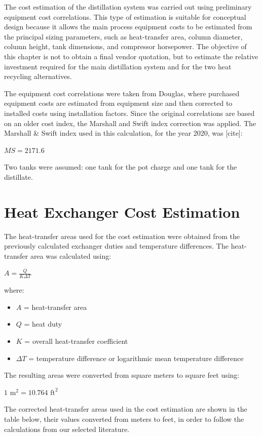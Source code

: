 The cost estimation of the distillation system was carried out using
preliminary equipment cost correlations. This type of estimation is
suitable for conceptual design because it allows the main process
equipment costs to be estimated from the principal sizing parameters,
such as heat-transfer area, column diameter, column height, tank
dimensions, and compressor horsepower. The objective of this chapter is
not to obtain a final vendor quotation, but to estimate the relative
investment required for the main distillation system and for the two
heat recycling alternatives.

The equipment cost correlations were taken from Douglas, where purchased
equipment costs are estimated from equipment size and then corrected to
installed costs using installation factors. Since the original
correlations are based on an older cost index, the Marshall and Swift
index correction was applied. The Marshall \& Swift index used in this
calculation, for the year 2020, was {[}cite{]}:

\(MS = 2171.6\)

Two tanks were assumed: one tank for the pot charge and one tank for the
distillate.

\section{Heat Exchanger Cost
Estimation}\label{heat-exchanger-cost-estimation}

The heat-transfer areas used for the cost estimation were obtained from
the previously calculated exchanger duties and temperature differences.
The heat-transfer area was calculated using:

\(A = \frac{Q}{K \Delta T}\)

where:

\begin{itemize}
\tightlist
\item
  \(A\) = heat-transfer area
\item
  \(Q\) = heat duty
\item
  \(K\) = overall heat-transfer coefficient
\item
  \(\Delta T\) = temperature difference or logarithmic mean temperature
  difference
\end{itemize}

The resulting areas were converted from square meters to square feet
using:

\(1 \text{ m}^2 = 10.764 \text{ ft}^2\)

The corrected heat-transfer areas used in the cost estimation are shown
in the table below, their values converted from meters to feet, in order
to follow the calculations from our selected literature.

